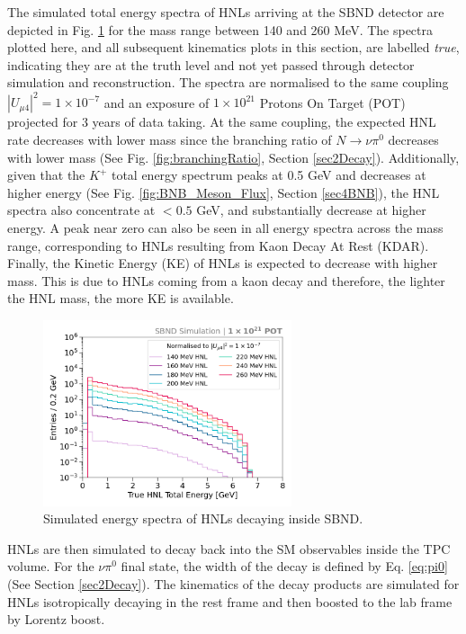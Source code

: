 The simulated total energy spectra of HNLs arriving at the SBND detector are depicted in Fig. \ref{fig:HNL_Energy_Spectrum} for the mass range between 140 and 260 MeV.
The spectra plotted here, and all subsequent kinematics plots in this section, are labelled \textit{true}, indicating they are at the truth level and not yet passed through detector simulation and reconstruction.
The spectra are normalised to the same coupling $|U_{\mu4}|^{2} = 1 \times 10^{-7}$ and an exposure of $1 \times 10^{21}$ Protons On Target (POT) projected for 3 years of data taking.
At the same coupling, the expected HNL rate decreases with lower mass since the branching ratio of $N \rightarrow \nu\pi^0$ decreases with lower mass (See Fig. \ref{fig:branchingRatio}, Section \ref{sec2Decay}).
Additionally, given that the $K^{+}$ total energy spectrum peaks at 0.5 GeV and decreases at higher energy (See Fig. \ref{fig:BNB_Meson_Flux}, Section \ref{sec4BNB}), the HNL spectra also concentrate at $<0.5$ GeV, and substantially decrease at higher energy. 
A peak near zero can also be seen in all energy spectra across the mass range, corresponding to HNLs resulting from Kaon Decay At Rest (KDAR).
Finally, the Kinetic Energy (KE) of HNLs is expected to decrease with higher mass.
This is due to HNLs coming from a kaon decay and therefore, the lighter the HNL mass, the more KE is available.

\begin{figure}[hb!] 
\centering    
\includegraphics[width=0.65\textwidth]{HNL_Energy_Spectrum}
\caption[Simulated Energy Spectra of HNLs Decaying Inside SBND]{
Simulated energy spectra of HNLs decaying inside SBND.
}
\label{fig:HNL_Energy_Spectrum}
\end{figure}

HNLs are then simulated to decay back into the SM observables inside the TPC volume.
For the $\nu\pi^{0}$ final state, the width of the decay is defined by Eq. \ref{eq:pi0} (See Section \ref{sec2Decay}).
The kinematics of the decay products are simulated for HNLs isotropically decaying in the rest frame and then boosted to the lab frame by Lorentz boost.

